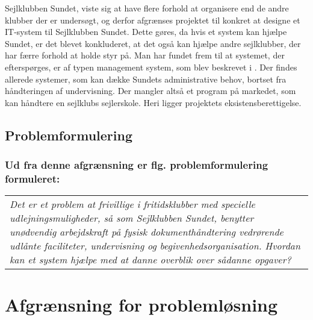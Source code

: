 Sejlklubben Sundet, viste sig at have flere forhold at organisere end de andre klubber der er undersøgt, og derfor afgrænses projektet til konkret at designe et IT-system til Sejlklubben Sundet. 
Dette gøres, da hvis et system kan hjælpe Sundet, er det blevet konkluderet, at det også kan hjælpe andre sejlklubber, der har færre forhold at holde styr på.
Man har fundet frem til at systemet, der efterspørges, er af typen management system, som blev beskrevet i .
Der findes allerede systemer, som kan dække Sundets administrative behov, bortset fra håndteringen af undervisning.
Der mangler altså et program på markedet, som kan håndtere en sejlklubs sejlerskole.
Heri ligger projektets eksistensberettigelse.

\subsection*{Problemformulering}
\subsubsection*{Ud fra denne afgrænsning er flg. problemformulering formuleret:}

\begin{center}
  \begin{tabular}{|p{14cm}|}
    \textit{Det er et problem at frivillige i fritidsklubber med specielle udlejningsmuligheder, så som Sejlklubben Sundet, benytter unødvendig arbejdskraft på fysisk dokumenthåndtering vedrørende udlånte faciliteter, undervisning og begivenhedsorganisation. 
    Hvordan kan et system hjælpe med at danne overblik over sådanne opgaver?}
  \end{tabular}
\end{center}


\section{Afgrænsning for problemløsning}

